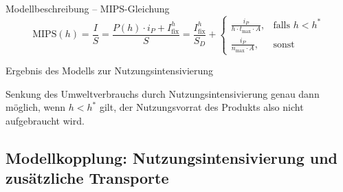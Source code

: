 \documentclass[beamer, xcolor={table,usenames,dvipsnames}]{beamer}
\begin{document}
	\begin{frame}{Modellbeschreibung -- MIPS-Gleichung}
			$$\text{MIPS}(h) = \frac{I}{S} = \frac{P(h) \cdot i_P + I_{\text{fix}}^h}{S} =
			\frac{I_{\text{fix}}^h}{S_D} + \left\{ \begin{array}{cl}  \frac{i_P}{h \cdot t_{\text{max}} \cdot A}, & \mbox{falls } h < h^* \\[5pt] \frac{i_P}{n_{\text{max}} \cdot A}, & \mbox{sonst} \end{array}\right.$$
		\pause
		\begin{center}
			\resizebox{0.7\linewidth}{!}{
				
			}
		\end{center}
	\end{frame}

	\begin{frame}{Ergebnis des Modells zur Nutzungsintensivierung}		
        \begin{block}{}
            Senkung des Umweltverbrauchs durch Nutzungsintensivierung genau dann
            möglich, wenn $ h < h^*$ gilt, der Nutzungsvorrat des Produkts also
            nicht aufgebraucht wird.
        \end{block}
	\end{frame}

    \subsection{Modellkopplung: Nutzungsintensivierung und zusätzliche Transporte}
    \frame{\subsectionpage}
\end{document}
